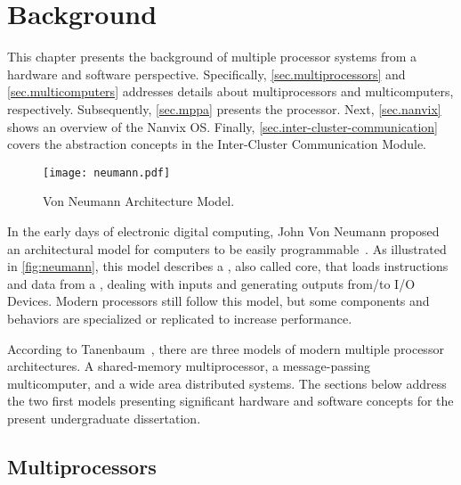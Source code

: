 \chapter{Background}
\label{ch.fundamentation}


	This chapter presents the background of multiple processor
	systems from a hardware and software perspective.
	Specifically, \autoref{sec.multiprocessors} and \autoref{sec.multicomputers}
	addresses details about multiprocessors and multicomputers, respectively.
	Subsequently, \autoref{sec.mppa} presents the \mppa processor.
	Next, \autoref{sec.nanvix} shows an overview of the Nanvix OS.
	Finally, \autoref{sec.inter-cluster-communication} covers the abstraction
	concepts in the Inter-Cluster Communication Module.

	\begin{figure}[!tb]
		\centering%
		\caption{Von Neumann Architecture Model.}%
		\label{fig:neumann}%
		\texttt{[image: neumann.pdf]}%
	\end{figure}

	In the early days of electronic digital computing, John Von Neumann
	proposed an architectural model for computers to be easily programmable~\cite{von-neumann:model}.
	As illustrated in \autoref{fig:neumann}, this model describes a \cpu,
	also called core, that loads instructions and data from a \mmu,
	dealing with inputs and generating outputs from/to I/O Devices.
	Modern processors still follow this model, but some components and
	behaviors are specialized or replicated to increase performance.

	According to Tanenbaum~\cite{tanenbaum:4ed}, there are three models of
	modern multiple processor architectures.
	A shared-memory multiprocessor, a message-passing multicomputer, and a wide
	area distributed systems.
	The sections below address the two first models presenting significant
	hardware and software concepts for the present undergraduate dissertation.

	\section{Multiprocessors}
	\label{sec.multiprocessors}


